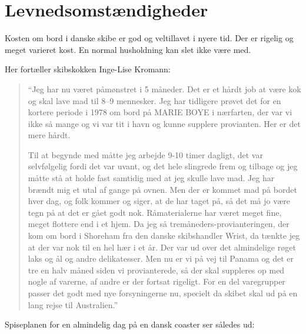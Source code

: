 \chapter{Levnedsomstændigheder}\label{levnedsomstuxe6ndigheder}

Kosten om bord i danske skibe er god og veltillavet i nyere tid. Der er
rigelig og meget varieret kost. En normal husholdning kan slet ikke være
med. 

Her fortæller skibskokken Inge-Lise Kromann: 

\begin{quote}
    ``Jeg har nu været
    påmønstret i 5 måneder. Det er et hårdt job at være kok og skal lave mad
    til 8--9 mennesker. Jeg har tidligere prøvet det for en kortere periode i
    1978 om bord på MARIE BOYE i nærfarten, der var vi ikke så mange og vi
    var tit i havn og kunne supplere provianten. Her er det mere hårdt. 
    
    Til at begynde med måtte jeg arbejde 9-10 timer dagligt, det var
    selvfølgelig fordi det var uvant, og det hele slingrede frem og tilbage og
    jeg måtte stå at holde fast samtidig med at jeg skulle lave mad. Jeg har
    brændt mig et utal af gange på ovnen. Men der er kommet mad på bordet hver
    dag, og folk kommer og siger, at de har taget på, så det må jo være tegn
    på at det er gået godt nok. Råmaterialerne har været meget fine, meget
    flottere end i et hjem. Da jeg så tremåneders-provianteringen, der kom om
    bord i Shoreham fra den danske skibshandler Wrist, da tænkte jeg at der
    var nok til en hel hær i et år.  Der var ud over det almindelige røget
    laks og ål og andre delikatesser.  Men nu er vi på vej til Panama og det
    er tre en halv måned siden vi provianterede, så der skal suppleres op med
    nogle af varerne, af andre er der fortsat rigeligt. For en del varegrupper
    passer det godt med nye forsyningerne nu, specielt da skibet skal ud på en
    lang rejse til Australien.'' 
\end{quote}

Spiseplanen for en almindelig dag på en dansk coaster ser
således ud: 


